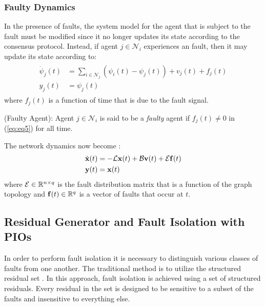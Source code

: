 \documentclass[letterpaper, 11 pt, conference]{ieeeconf}  %
\begin{document}
\subsubsection{Faulty Dynamics} In the presence of faults, the system model for the agent that is subject to the fault must be modified since it no longer updates its state according to the consensus protocol. Instead, if agent $j \in \mathcal{N}_i$ experiences an fault, then it may update its state according to:
\begin{gather} 
\begin{aligned} %
\dot{\psi}_j(t) &= \sum_{i \in \mathcal{N}_j} (\psi_i(t) - \psi_j(t))+v_j (t) + f_j(t) \nonumber \\
y_j(t) &= \psi_j(t)
\end{aligned}
\end{gather}
where $f_j(t)$ is a function of time that is due to the fault signal. 
\begin{definition}
(Faulty Agent): Agent $j \in \mathcal{N}_i$ is said to be a \textit{faulty} agent if $f_j(t) \neq 0$ in (\ref{eq:eq5}) for all time. 
\end{definition}
The network dynamics now become \cite{teixeira_toward_2014}:
\begin{gather} \label{eq:eq6}
\begin{aligned} 
\dot{\mathbf{x}}(t) &= -\mathcal{L}\mathbf{x}(t)+\mathcal{B} \mathbf{v}(t) + \mathcal{E} \mathbf{f}(t) \\
\mathbf{y}(t) &= \mathbf{x}(t)
\end{aligned}
\end{gather}
 where $\mathcal{E} \in \mathbb{R}^{n \times q}$ is the fault distribution matrix that is a function of the graph topology and $\mathbf{f}(t) \in \mathbb{R}^q$ is a vector of faults that occur at $t$. %
\subsection{Residual Generator and Fault Isolation with PIOs}
In order to perform fault isolation it is necessary to distinguish various classes of faults from one another. The traditional method is to utilize the structured residual set \cite{chen_robust_1999}. In this approach, fault isolation is achieved using a set of structured residuals.  Every residual in the set is designed to be sensitive to a subset of the faults and insensitive to everything else. 

\medskip
\end{document}
